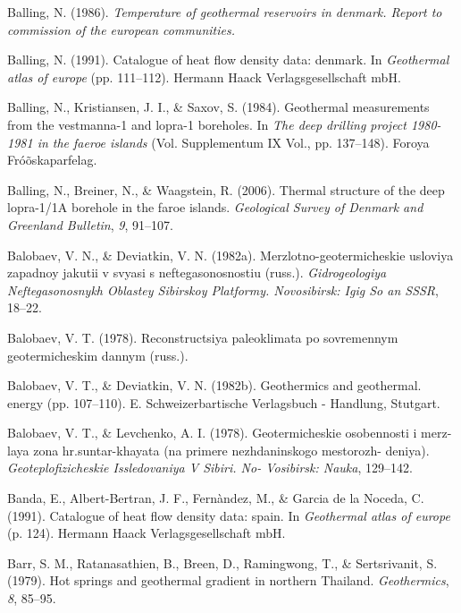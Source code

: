 \begin{CSLReferences}{1}{1}
\leavevmode{}%
Balling, N. (1986). \emph{Temperature of geothermal reservoirs in denmark. Report to commission of the european communities.}

\leavevmode{}%
Balling, N. (1991). Catalogue of heat flow density data: denmark. In \emph{Geothermal atlas of europe} (pp. 111--112). Hermann Haack Verlagsgesellschaft mbH.

\leavevmode{}%
Balling, N., Kristiansen, J. I., \& Saxov, S. (1984). Geothermal measurements from the vestmanna-1 and lopra-1 boreholes. In \emph{The deep drilling project 1980-1981 in the faeroe islands} (Vol. Supplementum IX Vol., pp. 137--148). F{o}roya Fróõskaparfelag.

\leavevmode{}%
Balling, N., Breiner, N., \& Waagstein, R. (2006). Thermal structure of the deep lopra-1/1A borehole in the faroe islands. \emph{Geological Survey of Denmark and Greenland Bulletin}, \emph{9}, 91--107.

\leavevmode{}%
Balobaev, V. N., \& Deviatkin, V. N. (1982a). Merzlotno-geotermicheskie usloviya zapadnoy jakutii v svyasi s neftegasonosnostiu (russ.). \emph{Gidrogeologiya Neftegasonosnykh Oblastey Sibirskoy Platformy. Novosibirsk: Igig So an SSSR}, 18--22.

\leavevmode{}%
Balobaev, V. T. (1978). Reconstructsiya paleoklimata po sovremennym geotermicheskim dannym (russ.).

\leavevmode{}%
Balobaev, V. T., \& Deviatkin, V. N. (1982b). Geothermics and geothermal. energy (pp. 107--110). E. Schweizerbartische Verlagsbuch - Handlung, Stutgart.

\leavevmode{}%
Balobaev, V. T., \& Levchenko, A. I. (1978). Geotermicheskie osobennosti i merz- laya zona hr.suntar-khayata (na primere nezhdaninskogo mestorozh- deniya). \emph{Geoteplofizicheskie Issledovaniya V Sibiri. No- Vosibirsk: Nauka}, 129--142.

\leavevmode{}%
Banda, E., Albert-Bertran, J. F., Fernàndez, M., \& Garcia de la Noceda, C. (1991). Catalogue of heat flow density data: spain. In \emph{Geothermal atlas of europe} (p. 124). Hermann Haack Verlagsgesellschaft mbH.

\leavevmode{}%
Barr, S. M., Ratanasathien, B., Breen, D., Ramingwong, T., \& Sertsrivanit, S. (1979). Hot springs and geothermal gradient in northern {Thailand}. \emph{Geothermics}, \emph{8}, 85--95.


\end{CSLReferences}
